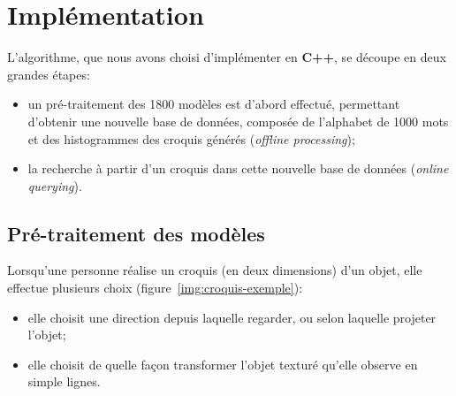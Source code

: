 \documentclass[12pt, a4paper, oneside]{article}
\begin{document}
\section{Implémentation}

L'algorithme, que nous avons choisi d'implémenter en \textbf{C++}, se découpe en deux grandes étapes:
\begin{itemize}
    \item un pré-traitement des \num{1800} modèles est d'abord effectué, permettant d'obtenir une nouvelle base de données, composée de l'alphabet de \num{1000} mots et des histogrammes des croquis générés (\emph{offline processing});
    \item la recherche à partir d'un croquis dans cette nouvelle base de données (\emph{online querying}).
\end{itemize}


\subsection{Pré-traitement des modèles}

Lorsqu'une personne réalise un croquis (en deux dimensions) d'un objet, elle effectue plusieurs choix (figure~\vref{img:croquis-exemple}):
\begin{itemize}
    \item elle choisit une direction depuis laquelle regarder, ou selon laquelle projeter l'objet;
    \item elle choisit de quelle façon transformer l'objet texturé qu'elle observe en simple lignes.
\end{itemize}
\end{document}
